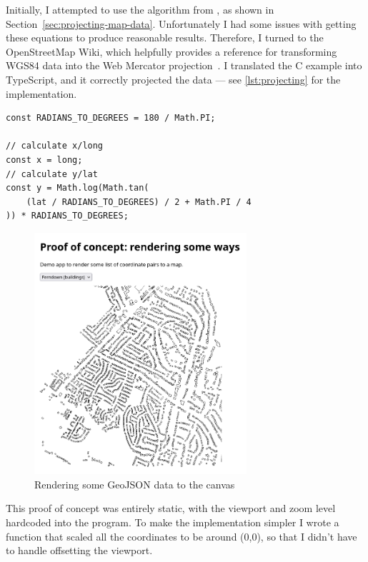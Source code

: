 \documentclass{final_report}
\begin{document}
Initially, I attempted to use the algorithm from \textcite[41]{snyder1987map}, as shown in Section~\ref{sec:projecting-map-data}. Unfortunately I had some issues with getting these equations to produce reasonable results. Therefore, I turned to the OpenStreetMap Wiki, which helpfully provides a reference for transforming WGS84 data into the Web Mercator projection~\cite{osm-wiki-mercator}. I translated the C example into TypeScript, and it correctly projected the data --- see \autoref{lst:projecting} for the implementation.

\begin{lstlisting}[caption=Projecting to Web Mercator, label=lst:projecting]
const RADIANS_TO_DEGREES = 180 / Math.PI;

// calculate x/long
const x = long;
// calculate y/lat
const y = Math.log(Math.tan(
    (lat / RADIANS_TO_DEGREES) / 2 + Math.PI / 4
)) * RADIANS_TO_DEGREES;
\end{lstlisting}

\begin{figure}[ht]
    \centering
    \includegraphics[width=0.7\textwidth]{../proof-of-concepts/2-rendering-a-way/screenshots/ferndown-buildings.png}
    \caption{Rendering some GeoJSON data to the canvas}\label{fig:rendering-geometry}
\end{figure}

This proof of concept was entirely static, with the viewport and zoom level hardcoded into the program. To make the implementation simpler I wrote a function that scaled all the coordinates to be around (0,0), so that I didn't have to handle offsetting the viewport.
\end{document}
